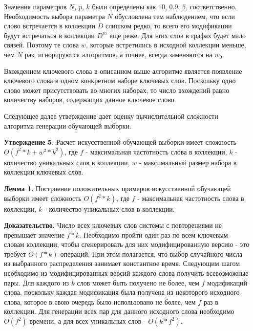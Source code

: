 Значения параметров $N$, $p$, $k$ были определены как $10$, $0.9$, $5$, соответственно. Необходимость выбора параметра $N$ обусловлена тем наблюдением, что если слово встречается в коллекции $D$ слишком редко, то всего его модификации будут встречаться в коллекции $D^m$ еще реже. Для этих слов в графах будет мало связей. Поэтому те слова $w$, которые встретились в исходной коллекции меньше, чем $N$ раз, игнорируются алгоритмов, а точнее, всегда заменяются на $w_0$.

Вхождением ключевого слова в описанном выше алгоритме является появление ключевого слова в одном конкретном наборе ключевых слов. Поскольку одно слово может присутствовать во многих наборах, то число вхождений равно количеству наборов, содержащих данное ключевое слово.

Следующее далее утверждение дает оценку вычислительной сложности алгоритма генерации обучающей выборки.

\textbf{Утверждение 5.} Расчет искусственной обучающей выборки имеет сложность $O(f^2 * k + w^2 * k^2)$, где $f$ - максимальная частотность слова в коллекции, $k$ - количество уникальных слов в коллекции, $w$ - максимальный размер набора в коллекции ключевых слов.

%

\textbf{Лемма 1.} Построение положительных примеров искусственной обучающей выборки имеет сложность $O(f^2 * k)$, где $f$ - максимальная частотность слова в коллекции, $k$ - количество уникальных слов в коллекции.

\textbf{Доказательство.} 
Число всех ключевых слов системы с повторениями не превышает значение $f * k$. Необходимо пройти один раз по всем ключевым словам коллекции, чтобы сгенерировать для них модифицированную версию - это требует $O(f * k)$ операций. При этом полагается, что выбор случайного числа из выбранного распределения занимает константное время. Следующим шагом необходимо из модифицированных версий каждого слова получить всевозможные пары. Для каждого из $k$ слов может быть получено не более, чем $f$ модификаций слова, поскольку каждая модификация была получена из некоторого исходного слова, которое в свою очередь было использовано не более, чем $f$ раз в коллекции. Для генерации всех пар для данного исходного слова необходимо $O(f^2)$ времени, а для всех уникальных слов - $O(k * f^2)$.

